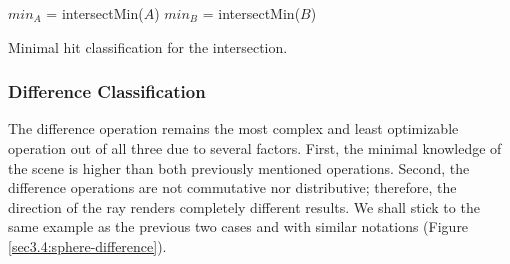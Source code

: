 \documentclass[a4paper,11pt,oneside]{article}
\begin{document}
\begin{algorithm}
	\SetAlgoLined
	$min_A$ = intersectMin($A$)\;
	$min_B$ = intersectMin($B$)\;
	\caption{Minimal hit classification for the intersection.}
	\label{sec3.4:intersection_algo}
\end{algorithm}

\subsubsection{Difference Classification}
\label{section:minimal_difference_classficiation}

The difference operation remains the most complex and least optimizable operation out of all three due to several factors. First, the minimal knowledge of the scene is higher than both previously mentioned operations. Second, the difference operations are not commutative nor distributive; therefore, the direction of the ray renders completely different results. We shall stick to the same example as the previous two cases and with similar notations (Figure \ref{sec3.4:sphere-difference}).
\end{document}
